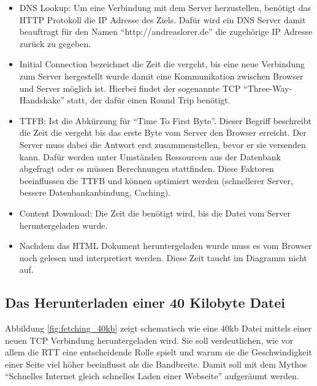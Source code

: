 			\begin{itemize}
				\item DNS Lookup: Um eine Verbindung mit dem Server herzustellen, benötigt das HTTP Protokoll die IP Adresse des Ziels. Dafür wird ein DNS Server damit beauftragt für den Namen "`http://andreaslorer.de"' die zugehörige IP Adresse zurück zu gegeben.

				\item Initial Connection bezeichnet die Zeit die vergeht, bis eine neue Verbindung zum Server hergestellt wurde damit eine Kommunikation zwischen Browser und Server möglich ist. Hierbei findet der sogenannte TCP "`Three-Way-Handshake"' statt, der dafür einen Round Trip benötigt.

				\item TTFB: Ist die Abkürzung für "`Time To First Byte"'. Dieser Begriff beschreibt die Zeit die vergeht bis das erste Byte vom Server den Browser erreicht. Der Server muss dabei die Antwort erst zusammenstellen, bevor er sie versenden kann. Dafür werden unter Umständen Ressourcen aus der Datenbank abgefragt oder es müssen Berechnungen stattfinden. Diese Faktoren beeinflussen die TTFB und können optimiert werden (schnellerer Server, bessere Datenbankanbindung, Caching).

				\item Content Download: Die Zeit die benötigt wird, bis die Datei vom Server heruntergeladen wurde.

				\item Nachdem das HTML Dokument heruntergeladen wurde muss es vom Browser noch gelesen und interpretiert werden. Diese Zeit taucht im Diagramm nicht auf.
			\end{itemize}
					

	\subsection{Das Herunterladen einer 40 Kilobyte Datei} %
	\label{sub:das_herunterladen_einer_40_kb_datei}
		Abbildung \ref{fig:fetching_40kb} zeigt schematisch wie eine 40kb Datei mittels einer neuen TCP Verbindung heruntergeladen wird. Sie soll verdeutlichen, wie vor allem die RTT eine entscheidende Rolle spielt und warum sie die Geschwindigkeit einer Seite viel höher beeinflusst als die Bandbreite. Damit soll mit dem Mythos "`Schnelles Internet gleich schnelles Laden einer Webseite"' aufgeräumt werden.

